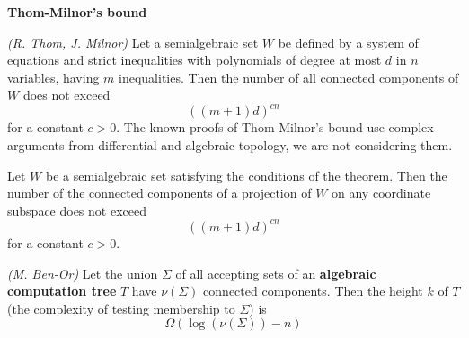 \textbf{Thom-Milnor’s bound}
\begin{theorem}
    \textit{(R. Thom, J. Milnor)}
    Let a semialgebraic set $W$ be defined by a system of
    equations and strict inequalities with polynomials of degree at most $d$ in $n$ variables,
    having $m$ inequalities.
    Then the number of all connected components of $W$ does not exceed
    $$((m + 1)d)^{cn}$$
    for a constant $c > 0$.
    The known proofs of Thom-Milnor’s bound use complex arguments from differential and algebraic topology,
    we are not considering them.
\end{theorem}

\begin{theorem}
    Let $W$ be a semialgebraic set satisfying the conditions of the theorem.
    Then the number of the connected components of a projection of $W$ on any coordinate subspace does not exceed
    $$((m + 1)d)^{cn}$$
    for a constant $c > 0$.
\end{theorem}

\begin{theorem}
    \textit{(M. Ben-Or)}
    Let the union $\Sigma$ of all accepting sets of an \textbf{algebraic computation tree} $T$
    have $\nu(\Sigma)$ connected components.
    Then the height $k$ of $T$ (the complexity of testing membership to $\Sigma$) is
    $$\Omega(\log(\nu(\Sigma)) − n)$$
\end{theorem}

